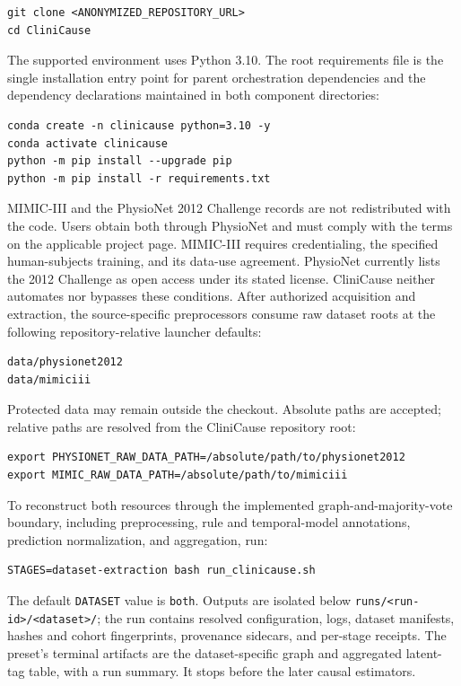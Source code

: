 \documentclass[letterpaper,10pt]{article}
\begin{document}
\begin{verbatim}
git clone <ANONYMIZED_REPOSITORY_URL>
cd CliniCause
\end{verbatim}

The supported environment uses Python 3.10. The root requirements file is the
single installation entry point for parent orchestration dependencies and the
dependency declarations maintained in both component directories:

\begin{verbatim}
conda create -n clinicause python=3.10 -y
conda activate clinicause
python -m pip install --upgrade pip
python -m pip install -r requirements.txt
\end{verbatim}

MIMIC-III and the PhysioNet 2012 Challenge records are not redistributed with
the code. Users obtain both through PhysioNet and must comply with the terms on
the applicable project page. MIMIC-III requires credentialing, the specified
human-subjects training, and its data-use agreement. PhysioNet currently lists
the 2012 Challenge as open access under its stated license. CliniCause neither
automates nor bypasses these conditions. After authorized acquisition and
extraction, the source-specific preprocessors consume raw dataset roots at the
following repository-relative launcher defaults:

\begin{verbatim}
data/physionet2012
data/mimiciii
\end{verbatim}

Protected data may remain outside the checkout. Absolute paths are accepted;
relative paths are resolved from the CliniCause repository root:

\begin{verbatim}
export PHYSIONET_RAW_DATA_PATH=/absolute/path/to/physionet2012
export MIMIC_RAW_DATA_PATH=/absolute/path/to/mimiciii
\end{verbatim}

To reconstruct both resources through the implemented graph-and-majority-vote
boundary, including preprocessing, rule and temporal-model annotations,
prediction normalization, and aggregation, run:

\begin{verbatim}
STAGES=dataset-extraction bash run_clinicause.sh
\end{verbatim}

The default \texttt{DATASET} value is \texttt{both}. Outputs are isolated
below \texttt{runs/<run-id>/<dataset>/}; the run contains resolved
configuration, logs, dataset manifests, hashes and cohort fingerprints,
provenance sidecars, and per-stage receipts. The preset's terminal artifacts
are the dataset-specific graph and aggregated latent-tag table, with a run
summary. It stops before the later causal estimators.
\end{document}
